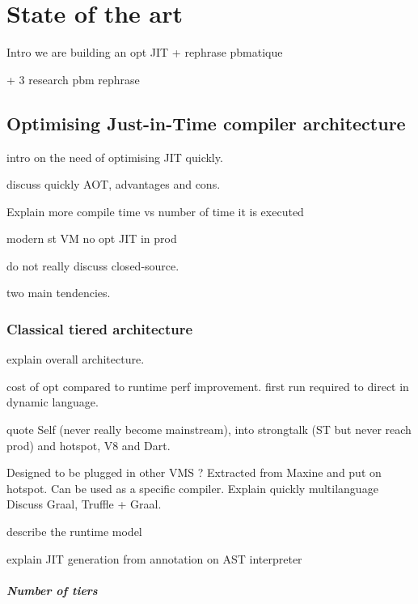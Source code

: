 \documentclass[a4paper,12pt,twoside]{../includes/ThesisStyle}
\begin{document}
\fi

\chapter{State of the art}
\label{chap:stateOfTheArt}
\minitoc

Intro we are building an opt JIT + rephrase pbmatique

+ 3 research pbm rephrase


\section{Optimising Just-in-Time compiler architecture}

intro on the need of optimising JIT quickly. 

discuss quickly AOT, advantages and cons.

Explain more compile time vs number of time it is executed

modern st VM no opt JIT in prod

do not really discuss closed-source.

two main tendencies.

\subsection{Classical tiered architecture}

explain overall architecture.

cost of opt compared to runtime perf improvement.
first run required to direct in dynamic language.

quote Self (never really become mainstream), into strongtalk (ST but never reach prod) and hotspot, V8 and Dart. 

Designed to be plugged in other VMS ? Extracted from Maxine and put on hotspot. Can be used as a specific compiler.
Explain quickly multilanguage
Discuss Graal, Truffle + Graal.

describe the runtime model

explain JIT generation from annotation on AST interpreter

\paragraph{Number of tiers}
\end{document}
